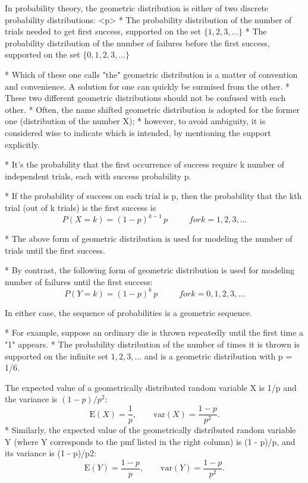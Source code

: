 In probability theory, the geometric distribution is either of two discrete probability distributions:
<p>
* The probability distribution of the number of trials needed to get first success, supported on the set $\{ 1, 2, 3, \ldots\}$
* The probability distribution of the number of failures before the first success, supported on the set $\{ 0, 1, 2, 3, \ldots\}$

* Which of these one calls "the" geometric distribution is a matter of convention and convenience. A solution for one can quickly be surmised from the other.
* These two different geometric distributions should not be confused with each other. 
* Often, the name shifted geometric distribution is adopted for the former one (distribution of the number X); 
* however, to avoid ambiguity, it is considered wise to indicate which is intended, by mentioning the support explicitly.

* It’s the probability that the first occurrence of success require k number of independent trials, each with success probability p. 

* If the probability of success on each trial is p, then the probability that the kth trial (out of k trials) is the first success is
\[  P(X = k) = (1-p)^{k-1}\,p\, \phantom{space} for k = 1, 2, 3, \ldots \]


* The above form of geometric distribution is used for modeling the number of trials until the first success. 

* By contrast, the following form of geometric distribution is used for modeling number of failures until the first success:
\[ P(Y=k) = (1 - p)^k\,p\, \phantom{space} for k = 0, 1, 2, 3, \ldots\]

\item
In either case, the sequence of probabilities is a geometric sequence.

* For example, suppose an ordinary die is thrown repeatedly until the first time a "1" appears. 
* The probability distribution of the number of times it is thrown is supported on the infinite set ${ 1, 2, 3, \ldots }$ and is a geometric distribution with p = 1/6.

\item

The expected value of a geometrically distributed random variable X is 1/p and the variance is $(1 - p)/p^2$:
\[ \mathrm{E}(X) = \frac{1}{p}, \qquad\mathrm{var}(X) = \frac{1-p}{p^2}. \]
* Similarly, the expected value of the geometrically distributed random variable Y (where Y corresponds to the pmf listed in the right column) is (1 - p)/p, 
and its variance is (1 - p)/p2:
\[ \mathrm{E}(Y) = \frac{1-p}{p}, \qquad\mathrm{var}(Y) = \frac{1-p}{p^2}.\]

